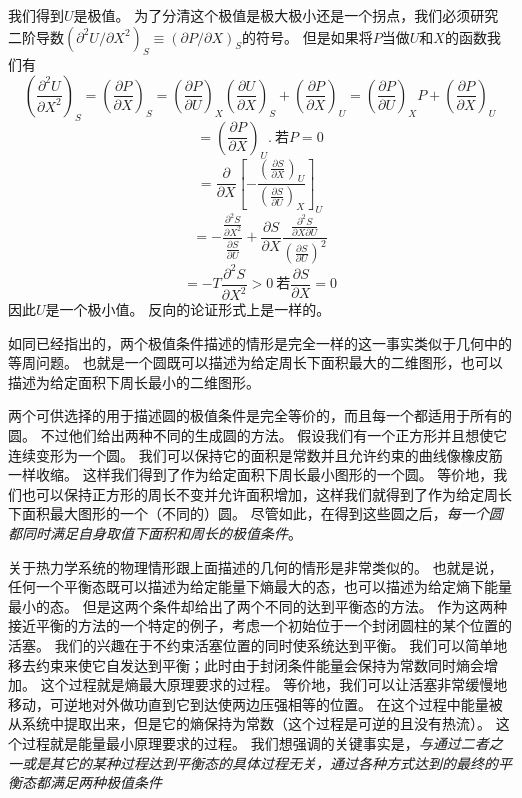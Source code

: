 我们得到$U$是极值。
为了分清这个极值是极大极小还是一个拐点，我们必须研究二阶导数$(\partial^2U/\partial X^2)_S\equiv(\partial P/\partial X)_S$的符号。
但是如果将$P$当做$U$和$X$的函数我们有
\begin{equation}
\label{equ5.3}
\left(\frac{\partial^2 U}{\partial X^2}\right)_S
=\left(\frac{\partial P}{\partial X}\right)_S
=\left(\frac{\partial P}{\partial U}\right)_X
\left(\frac{\partial U}{\partial X}\right)_S
+\left(\frac{\partial P}{\partial X}\right)_U
=\left(\frac{\partial P}{\partial U}\right)_XP
+\left(\frac{\partial P}{\partial X}\right)_U
\end{equation}
\begin{equation}
\label{equ5.4}
=\left(\frac{\partial P}{\partial X}\right)_U.~\text{若}P=0
\end{equation}
\begin{equation}
\label{equ5.5}
=\frac{\partial}{\partial X}
\left[-\frac{\left(\frac{\partial S}{\partial X}\right)_U}{\left(\frac{\partial S}{\partial U}\right)_X}\right]_U
\end{equation}
\begin{equation}
\label{equ5.6}
=-\frac{\frac{\partial^2S}{\partial X^2}}
{\frac{\partial S}{\partial U}}+\frac{\partial S}{\partial X}
\frac{\frac{\partial^2S}{\partial X\partial U}}{\left(\frac{\partial S}{\partial U}\right)^2}
\end{equation}
\begin{equation}
\label{equ5.7}
=-T\frac{\partial^2S}{\partial X^2}>0
~\text{若}\frac{\partial S}{\partial X}=0
\end{equation}
因此$U$是一个极小值。
反向的论证形式上是一样的。

如同已经指出的，两个极值条件描述的情形是完全一样的这一事实类似于几何中的等周问题。
也就是一个圆既可以描述为给定周长下面积最大的二维图形，也可以描述为给定面积下周长最小的二维图形。


两个可供选择的用于描述圆的极值条件是完全等价的，而且每一个都适用于所有的圆。
不过他们给出两种不同的生成圆的方法。
假设我们有一个正方形并且想使它连续变形为一个圆。
我们可以保持它的面积是常数并且允许约束的曲线像橡皮筋一样收缩。
这样我们得到了作为给定面积下周长最小图形的一个圆。
等价地，我们也可以保持正方形的周长不变并允许面积增加，这样我们就得到了作为给定周长下面积最大图形的一个（不同的）圆。
尽管如此，在得到这些圆之后，{\it 每一个圆都同时满足自身取值下面积和周长的极值条件}。

关于热力学系统的物理情形跟上面描述的几何的情形是非常类似的。
也就是说，任何一个平衡态既可以描述为给定能量下熵最大的态，也可以描述为给定熵下能量最小的态。
但是这两个条件却给出了两个不同的达到平衡态的方法。
作为这两种接近平衡的方法的一个特定的例子，考虑一个初始位于一个封闭圆柱的某个位置的活塞。
我们的兴趣在于不约束活塞位置的同时使系统达到平衡。
我们可以简单地移去约束来使它自发达到平衡；此时由于封闭条件能量会保持为常数同时熵会增加。
这个过程就是熵最大原理要求的过程。
等价地，我们可以让活塞非常缓慢地移动，可逆地对外做功直到它到达使两边压强相等的位置。
在这个过程中能量被从系统中提取出来，但是它的熵保持为常数（这个过程是可逆的且没有热流）。
这个过程就是能量最小原理要求的过程。
我们想强调的关键事实是，{\it 与通过二者之一或是其它的某种过程达到平衡态的具体过程无关，通过各种方式达到的最终的平衡态都满足两种极值条件}

